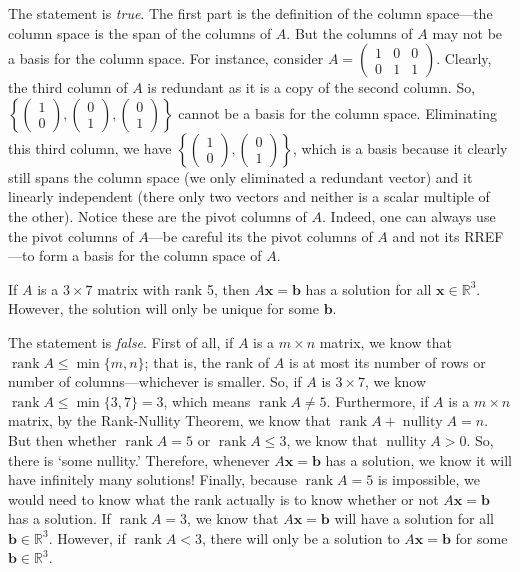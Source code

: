 \documentclass[11pt,letterpaper]{article}
\DeclareMathOperator{\rank}{rank}
\DeclareMathOperator{\nullity}{nullity}
\begin{document}
\sol The statement is \textit{true}. The first part is the definition of the column space---the column space is the span of the columns of $A$. But the columns of $A$ may not be a basis for the column space. For instance, consider $A= \begin{pmatrix} 1 & 0 & 0 \\ 0 & 1 & 1 \end{pmatrix}$. Clearly, the third column of $A$ is redundant as it is a copy of the second column. So, $\left\{ \begin{pmatrix} 1 \\ 0 \end{pmatrix}, \begin{pmatrix} 0 \\ 1 \end{pmatrix}, \begin{pmatrix} 0 \\ 1 \end{pmatrix} \right\}$ cannot be a basis for the column space. Eliminating this third column, we have $\left\{ \begin{pmatrix} 1 \\ 0 \end{pmatrix}, \begin{pmatrix} 0 \\ 1 \end{pmatrix} \right\}$, which is a basis because it clearly still spans the column space (we only eliminated a redundant vector) and it linearly independent (there only two vectors and neither is a scalar multiple of the other). Notice these are the pivot columns of $A$. Indeed, one can always use the pivot columns of $A$---be careful its the pivot columns of $A$ and not its RREF---to form a basis for the column space of $A$. \pvspace{1.3cm}



 If $A$ is a $3 \times 7$ matrix with rank 5, then $A \mathbf{x}= \mathbf{b}$ has a solution for all $\mathbf{x} \in \mathbb{R}^3$. However, the solution will only be unique for some $\mathbf{b}$. \pspace

\sol The statement is \textit{false}. First of all, if $A$ is a $m \times n$ matrix, we know that $\rank A \leq \min\{ m, n \}$; that is, the rank of $A$ is at most its number of rows or number of columns---whichever is smaller. So, if $A$ is $3 \times 7$, we know $\rank A \leq \min\{ 3, 7 \}= 3$, which means $\rank A \neq 5$. Furthermore, if $A$ is a $m \times n$ matrix, by the Rank-Nullity Theorem, we know that $\rank A + \nullity A= n$. But then whether $\rank A= 5$ or $\rank A \leq 3$, we know that $\nullity A > 0$. So, there is `some nullity.' Therefore, whenever $A\mathbf{x}= \mathbf{b}$ has a solution, we know it will have infinitely many solutions! Finally, because $\rank A= 5$ is impossible, we would need to know what the rank actually is to know whether or not $A\mathbf{x}= \mathbf{b}$ has a solution. If $\rank A= 3$, we know that $A\mathbf{x}= \mathbf{b}$ will have a solution for all $\mathbf{b} \in \mathbb{R}^3$. However, if $\rank A < 3$, there will only be a solution to $A\mathbf{x}= \mathbf{b}$ for some $\mathbf{b} \in \mathbb{R}^3$. \pvspace{1.3cm}
\end{document}
